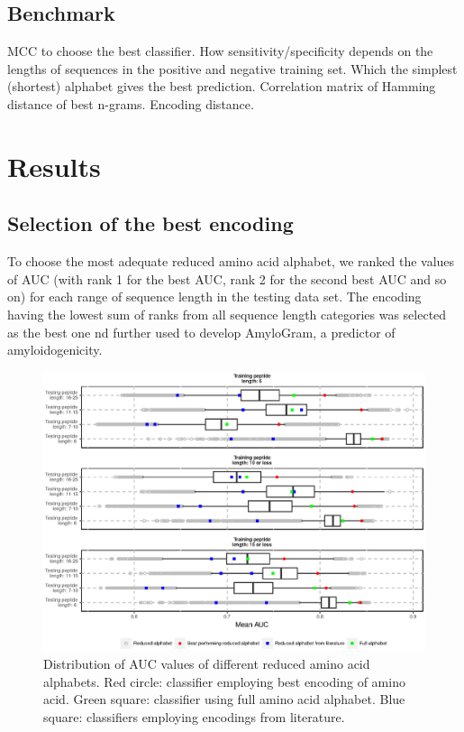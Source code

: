 \documentclass{bioinfo}
\begin{document}
\begin{methods}
\subsection{Benchmark}
\label{sec:bench}


MCC to choose the best classifier.
How sensitivity/specificity depends on the lengths of sequences in the positive and negative training set.
Which the simplest (shortest) alphabet gives the best prediction.
Correlation matrix of Hamming distance of best n-grams.
Encoding distance.

\end{methods}

\section{Results}

\subsection{Selection of the best encoding}
    To choose the most adequate reduced amino acid alphabet, we ranked the 
values of AUC (with rank 1 for the best AUC, rank 2 for the second best AUC and 
so on) for each range of sequence length in the testing data set. The encoding 
having the lowest sum of ranks from all sequence length categories was selected 
as the best one nd further used to develop AmyloGram, a predictor of 
amyloidogenicity.


\begin{figure}[!tpb]
\centerline{\includegraphics{figures/AUC_boxplot.eps}}
\caption{Distribution of AUC values of different reduced amino acid alphabets. Red circle: classifier employing best encoding of amino acid. Green square: classifier using full amino acid alphabet. Blue square: classifiers employing encodings from literature.}\label{fig:AUC_boxplot}
\end{figure}
\end{document}
